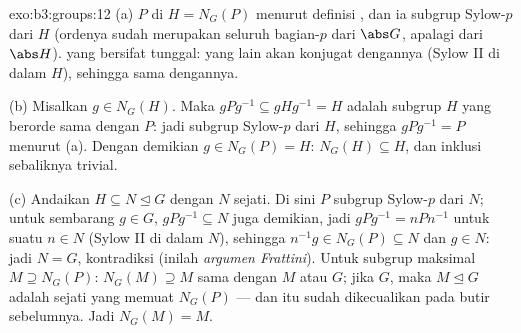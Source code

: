 \begin{solution}{exo:b3:groups:12}
(a) $P$  di $H = N_G(P)$ menurut definisi
, dan ia subgrup Sylow-$p$ dari $H$ (ordenya sudah
merupakan seluruh bagian-$p$ dari $\abs G$, apalagi dari $\abs H$).
 yang  bersifat tunggal: yang lain akan
konjugat dengannya (Sylow II di dalam $H$), sehingga sama dengannya.

(b) Misalkan $g \in N_G(H)$. Maka $gPg^{-1} \subseteq gHg^{-1} = H$
adalah subgrup $H$ yang berorde sama dengan $P$: jadi subgrup
Sylow-$p$ dari $H$, sehingga $gPg^{-1} = P$ menurut (a). Dengan demikian $g \in
N_G(P) = H$: $N_G(H) \subseteq H$, dan inklusi sebaliknya
trivial.

(c) Andaikan $H \subseteq N \trianglelefteq G$ dengan $N$ sejati.
Di sini $P$ subgrup Sylow-$p$ dari $N$; untuk sembarang $g \in G$,
$gPg^{-1} \subseteq N$ juga demikian, jadi $gPg^{-1} = nPn^{-1}$ untuk
suatu $n \in N$ (Sylow II di dalam $N$), sehingga $n^{-1}g \in N_G(P)
\subseteq N$ dan $g \in N$: jadi $N = G$, kontradiksi (inilah
\emph{argumen Frattini}). Untuk subgrup maksimal $M \supseteq
N_G(P)$: $N_G(M) \supseteq M$ sama dengan $M$ atau $G$; jika $G$,
maka $M \trianglelefteq G$ adalah  sejati yang
memuat $N_G(P)$ --- dan itu sudah dikecualikan pada butir sebelumnya. Jadi
$N_G(M) = M$.
\end{solution}

